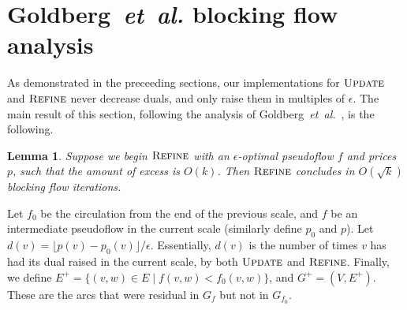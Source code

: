 \documentclass[11pt]{article}
\def\etal{\textsl{et~al.}}
\def\Refine{\textsc{Refine}}
\def\Update{\textsc{Update}}
\theoremstyle{plain}
\newtheorem{lemma}{Lemma}
\begin{document}
\section{Goldberg~{\etal} blocking flow analysis}
\label{section:blocking_flow_analysis}

As demonstrated in the preceeding sections, our implementations for $\Update$ and $\Refine$ 
never decrease duals, and only raise them in multiples of $\epsilon$.
The main result of this section, following the analysis of 
Goldberg~{\etal}~\cite{DBLP:journals/mst/GoldbergHKT17}, is the following.

\begin{lemma}
\label{lemma:refine_iterations}
	Suppose we begin $\Refine$ with an $\epsilon$-optimal pseudoflow $f$ and prices $p$,
	such that the amount of excess is $O(k)$.
	Then $\Refine$ concludes in $O(\sqrt{k})$ blocking flow iterations.
\end{lemma}

Let $f_0$ be the circulation from the end of the previous scale, 
and $f$ be an intermediate pseudoflow in the current scale
(similarly define $p_0$ and $p$).
Let $d(v) = \lfloor p(v) - p_0(v) \rfloor/\epsilon$.
Essentially, $d(v)$ is the number of times $v$ has had its dual raised in the current scale,
by both $\Update$ and $\Refine$.
Finally, we define $E^+ = \{(v, w) \in E \mid f(v, w) < f_0(v, w)\}$, and $G^+ = (V, E^+)$.
These are the arcs that were residual in $G_f$ but not in $G_{f_0}$.
\end{document}
